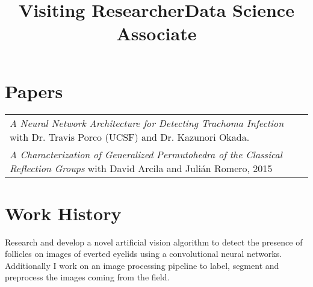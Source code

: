 \documentclass[margin,line,pifont,palatino,courier]{res}
\newenvironment{list1}{
  \begin{list}{\label{}}{%
      \setlength{\itemsep}{0in}
      \setlength{\parsep}{0in} \setlength{\parskip}{0in}
      \setlength{\topsep}{0in} \setlength{\partopsep}{0in}
      \setlength{\leftmargin}{0.0in}}}{\end{list}}
\begin{document}
\begin{resume}







\section{\sc Papers}
\begin{tabular}{@{}p{5in}}
    {\em A Neural Network Architecture for Detecting Trachoma Infection} with Dr. Travis Porco (UCSF) and Dr. Kazunori Okada. \\

    {\em A Characterization of Generalized Permutohedra of the Classical Reflection Groups} with David Arcila and Juli\'an Romero, 2015
\end{tabular}









\section{\sc  Work History}

\title{Visiting Researcher}

\begin{position}
Research and develop a novel artificial vision algorithm to detect the presence of follicles on images of everted eyelids using a convolutional neural networks.  Additionally I work on an image processing pipeline to label, segment and preprocess the images coming from the field. 
\end{position}

 \title{Data Science Associate} 


\end{resume}
\end{document}
